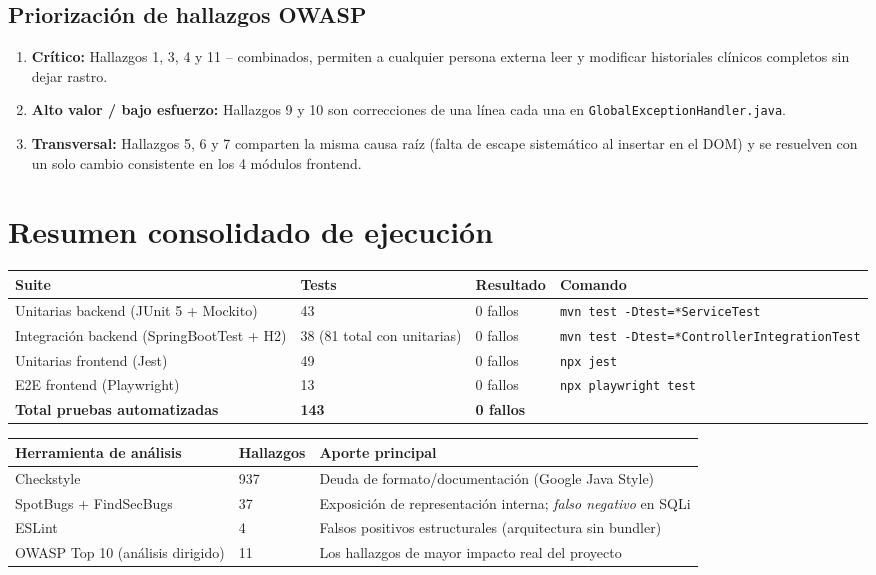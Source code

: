 \documentclass[11pt,a4paper]{article}
\begin{document}
\subsection*{Priorizaci\'on de hallazgos OWASP}

\begin{enumerate}[nosep]
  \item \textbf{Cr\'itico:} Hallazgos 1, 3, 4 y 11 -- combinados, permiten a
    cualquier persona externa leer y modificar historiales cl\'inicos
    completos sin dejar rastro.
  \item \textbf{Alto valor / bajo esfuerzo:} Hallazgos 9 y 10 son
    correcciones de una l\'inea cada una en \texttt{GlobalExceptionHandler.java}.
  \item \textbf{Transversal:} Hallazgos 5, 6 y 7 comparten la misma causa
    ra\'iz (falta de escape sistem\'atico al insertar en el DOM) y se
    resuelven con un solo cambio consistente en los 4 m\'odulos frontend.
\end{enumerate}

\newpage
\section{Resumen consolidado de ejecuci\'on}

\begin{longtable}{@{}p{6cm}p{2.5cm}p{2.5cm}p{3cm}@{}}
\toprule
\textbf{Suite} & \textbf{Tests} & \textbf{Resultado} & \textbf{Comando} \\
\midrule
\endhead
Unitarias backend (JUnit 5 + Mockito) & 43 & 0 fallos & \texttt{mvn test -Dtest=*ServiceTest} \\
Integraci\'on backend (SpringBootTest + H2) & 38 (81 total con unitarias) & 0 fallos & \texttt{mvn test -Dtest=*ControllerIntegrationTest} \\
Unitarias frontend (Jest) & 49 & 0 fallos & \texttt{npx jest} \\
E2E frontend (Playwright) & 13 & 0 fallos & \texttt{npx playwright test} \\
\midrule
\textbf{Total pruebas automatizadas} & \textbf{143} & \textbf{0 fallos} & \\
\bottomrule
\end{longtable}

\begin{longtable}{@{}p{6cm}p{2.5cm}p{6cm}@{}}
\toprule
\textbf{Herramienta de an\'alisis} & \textbf{Hallazgos} & \textbf{Aporte principal} \\
\midrule
\endhead
Checkstyle & 937 & Deuda de formato/documentaci\'on (Google Java Style) \\
SpotBugs + FindSecBugs & 37 & Exposici\'on de representaci\'on interna; \emph{falso negativo} en SQLi \\
ESLint & 4 & Falsos positivos estructurales (arquitectura sin bundler) \\
OWASP Top 10 (an\'alisis dirigido) & 11 & Los hallazgos de mayor impacto real del proyecto \\
\bottomrule
\end{longtable}
\end{document}
